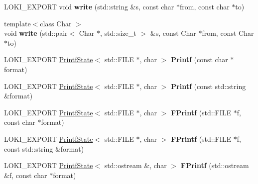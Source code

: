 \begin{DoxyCompactItemize}
\item 
\hypertarget{namespaceLoki_af139c308090964c87c01d47b71cdc23d}{}L\+O\+K\+I\+\_\+\+E\+X\+P\+O\+R\+T void {\bfseries write} (std\+::string \&s, const char $\ast$from, const char $\ast$to)\label{namespaceLoki_af139c308090964c87c01d47b71cdc23d}

\item 
\hypertarget{namespaceLoki_a940053ce504bc8b2fe8dc325d3c58c00}{}{\footnotesize template$<$class Char $>$ }\\void {\bfseries write} (std\+::pair$<$ Char $\ast$, std\+::size\+\_\+t $>$ \&s, const Char $\ast$from, const Char $\ast$to)\label{namespaceLoki_a940053ce504bc8b2fe8dc325d3c58c00}

\item 
\hypertarget{namespaceLoki_af51e81a08c9b97383fb3ef4d7e527a53}{}L\+O\+K\+I\+\_\+\+E\+X\+P\+O\+R\+T \hyperlink{structLoki_1_1PrintfState}{Printf\+State}$<$ std\+::\+F\+I\+L\+E $\ast$, char $>$ {\bfseries Printf} (const char $\ast$format)\label{namespaceLoki_af51e81a08c9b97383fb3ef4d7e527a53}

\item 
\hypertarget{namespaceLoki_a289e5e9bac17bbdf58ccae29174e5c24}{}L\+O\+K\+I\+\_\+\+E\+X\+P\+O\+R\+T \hyperlink{structLoki_1_1PrintfState}{Printf\+State}$<$ std\+::\+F\+I\+L\+E $\ast$, char $>$ {\bfseries Printf} (const std\+::string \&format)\label{namespaceLoki_a289e5e9bac17bbdf58ccae29174e5c24}

\item 
\hypertarget{namespaceLoki_aedb91c16f896bd1eb36e7bb103ee99c5}{}L\+O\+K\+I\+\_\+\+E\+X\+P\+O\+R\+T \hyperlink{structLoki_1_1PrintfState}{Printf\+State}$<$ std\+::\+F\+I\+L\+E $\ast$, char $>$ {\bfseries F\+Printf} (std\+::\+F\+I\+L\+E $\ast$f, const char $\ast$format)\label{namespaceLoki_aedb91c16f896bd1eb36e7bb103ee99c5}

\item 
\hypertarget{namespaceLoki_a686b83cf15b41727d98a2f91dafbc005}{}L\+O\+K\+I\+\_\+\+E\+X\+P\+O\+R\+T \hyperlink{structLoki_1_1PrintfState}{Printf\+State}$<$ std\+::\+F\+I\+L\+E $\ast$, char $>$ {\bfseries F\+Printf} (std\+::\+F\+I\+L\+E $\ast$f, const std\+::string \&format)\label{namespaceLoki_a686b83cf15b41727d98a2f91dafbc005}

\item 
\hypertarget{namespaceLoki_ab1f83393226c3d9b17f75fb550d7427b}{}L\+O\+K\+I\+\_\+\+E\+X\+P\+O\+R\+T \hyperlink{structLoki_1_1PrintfState}{Printf\+State}$<$ std\+::ostream \&, char $>$ {\bfseries F\+Printf} (std\+::ostream \&f, const char $\ast$format)\label{namespaceLoki_ab1f83393226c3d9b17f75fb550d7427b}


\end{DoxyCompactItemize}
